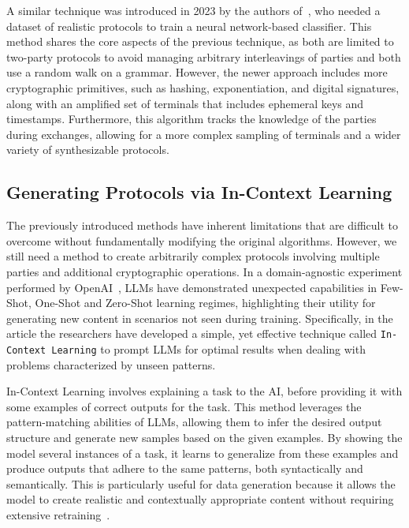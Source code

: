 A similar technique was introduced in 2023 by the authors of~\cite{ohno2023security}, who needed a dataset of realistic protocols to train a neural network-based classifier. This method shares the core aspects of the previous technique, as both are limited to two-party protocols to avoid managing arbitrary interleavings of parties and both use a random walk on a grammar. However, the newer approach includes more cryptographic primitives, such as hashing, exponentiation, and digital signatures, along with an amplified set of terminals that includes ephemeral keys and timestamps. Furthermore, this algorithm tracks the knowledge of the parties during exchanges, allowing for a more complex sampling of terminals and a wider variety of synthesizable protocols.

\subsection{Generating Protocols via In-Context Learning}
The previously introduced methods have inherent limitations that are difficult to overcome without fundamentally modifying the original algorithms. However, we still need a method to create arbitrarily complex protocols involving multiple parties and additional cryptographic operations. In a domain-agnostic experiment performed by OpenAI~\cite{llmfewshot}, LLMs have demonstrated unexpected capabilities in Few-Shot, One-Shot and Zero-Shot learning regimes, highlighting their utility for generating new content in scenarios not seen during training. Specifically, in the article the researchers have developed a simple, yet effective technique called \texttt{In-Context Learning} to prompt LLMs for optimal results when dealing with problems characterized by unseen patterns.

In-Context Learning involves explaining a task to the AI, before providing it with some examples of correct outputs for the task. This method leverages the pattern-matching abilities of LLMs, allowing them to infer the desired output structure and generate new samples based on the given examples. By showing the model several instances of a task, it learns to generalize from these examples and produce outputs that adhere to the same patterns, both syntactically and semantically. This is particularly useful for data generation because it allows the model to create realistic and contextually appropriate content without requiring extensive retraining~\cite{incontextlearning}.

